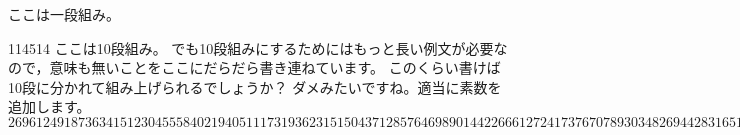 \documentclass{jsarticle}
\begin{document}
ここは一段組み。
\begin{multicols}{114514}
ここは10段組み。
でも10段組みにするためにはもっと長い例文が必要なので，意味も無いことをここにだらだら書き連ねています。
このくらい書けば10段に分かれて組み上げられるでしょうか？ ダメみたいですね。適当に素数を追加します。
\begin{equation}
269612491873634151230
455584021940511173193
623151504371285764698
9014422666127241737670789303482694428316513200446122750567310055826128065010005851605876098871271781802765706870225693734866095617430393326085694696874652726420479355351849706138404907284637184062762327781372517610391
\end{equation}
\end{multicols}
\end{document}
